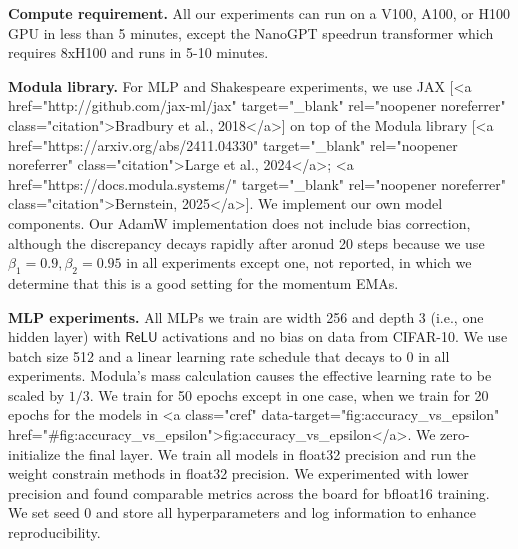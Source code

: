 \textbf{Compute requirement.} All our experiments can run on a V100, A100, or H100 GPU in less than 5 minutes, except the NanoGPT speedrun transformer which requires 8xH100 and runs in 5-10 minutes.

\textbf{Modula library.} For MLP and Shakespeare experiments, we use JAX [<a href="http://github.com/jax-ml/jax" target="_blank" rel="noopener noreferrer" class="citation">Bradbury et al., 2018</a>] on top of the Modula library [<a href="https://arxiv.org/abs/2411.04330" target="_blank" rel="noopener noreferrer" class="citation">Large et al., 2024</a>; <a href="https://docs.modula.systems/" target="_blank" rel="noopener noreferrer" class="citation">Bernstein, 2025</a>]. We implement our own model components. Our AdamW implementation does not include bias correction, although the discrepancy decays rapidly after aronud 20 steps because we use $\beta_1 = 0.9, \beta_2 = 0.95$ in all experiments except one, not reported, in which we determine that this is a good setting for the momentum EMAs.

\textbf{MLP experiments.} All MLPs we train are width 256 and depth 3 (i.e., one hidden layer) with $\mathsf{ReLU}$ activations and no bias on data from CIFAR-10. We use batch size 512 and a linear learning rate schedule that decays to 0 in all experiments. Modula's mass calculation causes the effective learning rate to be scaled by $1/3$. We train for 50 epochs except in one case, when we train for 20 epochs for the models in <a class="cref" data-target="fig:accuracy_vs_epsilon" href="#fig:accuracy_vs_epsilon">fig:accuracy_vs_epsilon</a>. We zero-initialize the final layer. We train all models in float32 precision and run the weight constrain methods in float32 precision. We experimented with lower precision and found comparable metrics across the board for bfloat16 training. We set seed 0 and store all hyperparameters and log information to enhance reproducibility.

